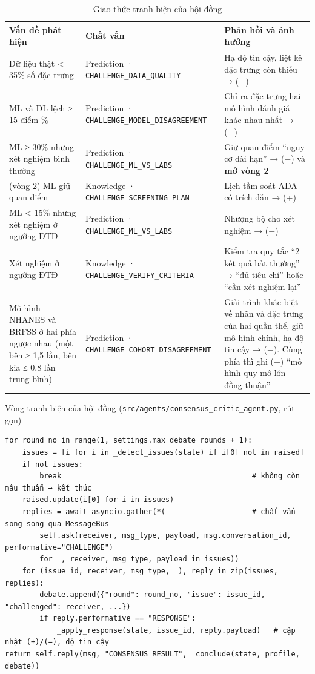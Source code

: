 \begin{table}[H]
\centering
\caption{Giao thức tranh biện của hội đồng}
\label{tab:debate}
\small
\begin{tabularx}{\linewidth}{@{}L{3.6cm}L{4.0cm}Y@{}}
\toprule
\textbf{Vấn đề phát hiện} & \textbf{Chất vấn} & \textbf{Phản hồi và ảnh hưởng} \\
\midrule
Dữ liệu thật < 35\% số đặc trưng & Prediction · \texttt{CHALLENGE\_DATA\_QUALITY} & Hạ độ tin cậy, liệt kê đặc trưng còn thiếu → (−) \\
ML và DL lệch ≥ 15 điểm \% & Prediction · \texttt{CHALLENGE\_MODEL\_DISAGREEMENT} & Chỉ ra đặc trưng hai mô hình đánh giá khác nhau nhất → (−) \\
ML ≥ 30\% nhưng xét nghiệm bình thường & Prediction · \texttt{CHALLENGE\_ML\_VS\_LABS} & Giữ quan điểm ``nguy cơ dài hạn'' → (−) và \textbf{mở vòng 2} \\
(vòng 2) ML giữ quan điểm & Knowledge · \texttt{CHALLENGE\_SCREENING\_PLAN} & Lịch tầm soát ADA có trích dẫn → (+) \\
ML < 15\% nhưng xét nghiệm ở ngưỡng ĐTĐ & Prediction · \texttt{CHALLENGE\_ML\_VS\_LABS} & Nhượng bộ cho xét nghiệm → (−) \\
Xét nghiệm ở ngưỡng ĐTĐ & Knowledge · \texttt{CHALLENGE\_VERIFY\_CRITERIA} & Kiểm tra quy tắc ``2 kết quả bất thường'' → ``đủ tiêu chí'' hoặc ``cần xét nghiệm lại'' \\
Mô hình NHANES và BRFSS ở hai phía ngược nhau (một bên ≥ 1,5 lần, bên kia ≤ 0,8 lần trung bình) & Prediction · \texttt{CHALLENGE\_COHORT\_DISAGREEMENT} & Giải trình khác biệt về nhãn và đặc trưng của hai quần thể, giữ mô hình chính, hạ độ tin cậy → (−). Cùng phía thì ghi (+) ``mô hình quy mô lớn đồng thuận'' \\
\bottomrule
\end{tabularx}
\end{table}

\begin{code}{Vòng tranh biện của hội đồng (\texttt{src/agents/consensus\_critic\_agent.py}, rút gọn)}
\label{lst:critic}
\begin{verbatim}
for round_no in range(1, settings.max_debate_rounds + 1):
    issues = [i for i in _detect_issues(state) if i[0] not in raised]
    if not issues:
        break                                            # không còn mâu thuẫn → kết thúc
    raised.update(i[0] for i in issues)
    replies = await asyncio.gather(*(                    # chất vấn song song qua MessageBus
        self.ask(receiver, msg_type, payload, msg.conversation_id, performative="CHALLENGE")
        for _, receiver, msg_type, payload in issues))
    for (issue_id, receiver, msg_type, _), reply in zip(issues, replies):
        debate.append({"round": round_no, "issue": issue_id, "challenged": receiver, ...})
        if reply.performative == "RESPONSE":
            _apply_response(state, issue_id, reply.payload)   # cập nhật (+)/(−), độ tin cậy
return self.reply(msg, "CONSENSUS_RESULT", _conclude(state, profile, debate))
\end{verbatim}
\end{code}


